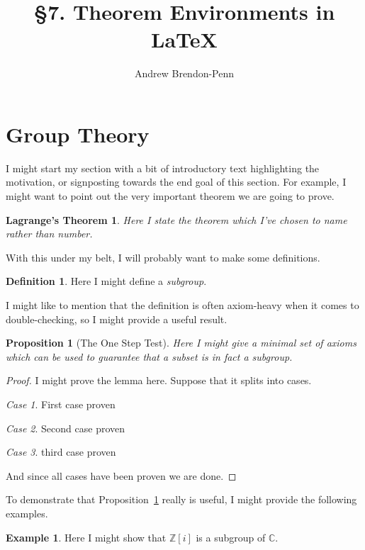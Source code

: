 \documentclass[a4paper,11pt]{article}
\title{\S7. Theorem Environments in \LaTeX}
\author{Andrew Brendon-Penn }
\theoremstyle{plain} %
\newtheorem{prop}[thm]{Proposition}
\newtheorem*{lagrange}{Lagrange's Theorem} %
\theoremstyle{definition} %
\newtheorem{defn}{Definition}[section]
\newtheorem{eg}{Example}[section]
\theoremstyle{remark} %
\newtheorem{case}{Case}
\begin{document}
\maketitle
\section{Group Theory}

I might start my section with a bit of introductory text highlighting the motivation, or signposting towards the end goal of this section. For example, I might want to point out the very important theorem we are going to prove.

\begin{lagrange}
	Here I state the theorem which I've \emph{chosen} to name rather than number.
\end{lagrange}

With this under my belt, I will probably want to make some definitions.

\begin{defn}
	Here I might define a \emph{subgroup}.
\end{defn}

I might like to mention that the definition is often axiom-heavy when it comes to double-checking, so I might provide a useful result.

\begin{prop}[The One Step Test]\label{prop:1steptest}
	Here I might give a minimal set of axioms which can be used to guarantee that a subset is in fact a subgroup.
\end{prop}

\begin{proof}
	I might prove the lemma here. Suppose that it splits into cases.
	\begin{case}
		First case proven
	\end{case}
	\begin{case}
		Second case proven
	\end{case}
	\begin{case}
		third case proven
	\end{case}
	And since all cases have been proven we are done.
\end{proof}

To demonstrate that Proposition~\ref{prop:1steptest} %
really is useful, I might provide the following examples.
\begin{eg}
	Here I might show that $\mathbb{Z}[i]$ is a subgroup of $\mathbb{C}$.
\end{eg}
\end{document}
